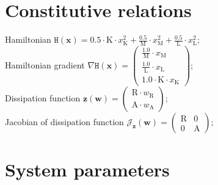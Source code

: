 \documentclass[11pt, oneside]{article}      %
\begin{document}
\section{Constitutive relations}
%
Hamiltonian $ \mathtt{H}(\mathbf{x}) = 0.5 \cdot \mathrm{K} \cdot x_{\mathrm{K}}^{2} + \frac{0.5}{\mathrm{M}} \cdot x_{\mathrm{M}}^{2} + \frac{0.5}{\mathrm{L}} \cdot x_{\mathrm{L}}^{2} ; $ 
%
\\
%
Hamiltonian gradient $ \nabla \mathtt{H}(\mathbf{x}) = \left(\begin{array}{c}\frac{1.0}{\mathrm{M}} \cdot x_{\mathrm{M}}\\\frac{1.0}{\mathrm{L}} \cdot x_{\mathrm{L}}\\1.0 \cdot \mathrm{K} \cdot x_{\mathrm{K}}\end{array}\right) ; $ 
%
\\
%
Dissipation function $ \mathbf{z}(\mathbf{w}) = \left(\begin{array}{c}\mathrm{R} \cdot w_{\mathrm{R}}\\\mathrm{A} \cdot w_{\mathrm{A}}\end{array}\right) ; $ 
%
\\
%
Jacobian of dissipation function $ \mathcal{J}_{\mathbf{z}}(\mathbf{w}) = \left(\begin{array}{cc}\mathrm{R} & 0\\0 & \mathrm{A}\end{array}\right) ; $ 
%
\\
%
%
\section{System parameters}
%
%
\end{document}
